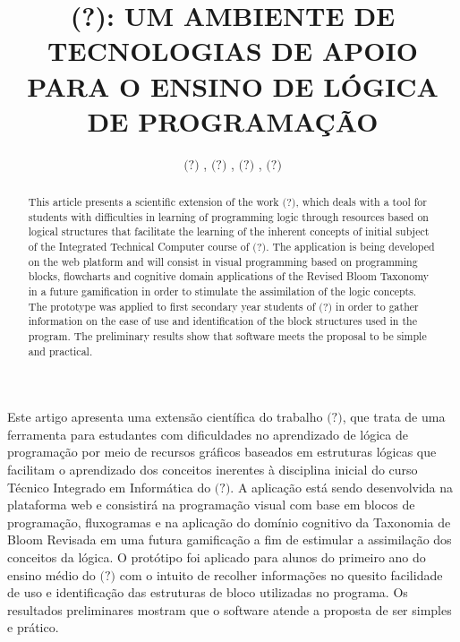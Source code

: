 \documentclass[12pt]{article}
\title{(?): UM AMBIENTE DE TECNOLOGIAS DE APOIO PARA O ENSINO DE LÓGICA DE PROGRAMAÇÃO}
\author{$\textbf{(?)}$ \inst{1}, $\textbf{(?)}$ \inst{1}, $\textbf{(?)}$ \inst{1}, $\textbf{(?)}$ \inst{1}}
\begin{document}
 

\maketitle

\begin{abstract}
This article presents a scientific extension of the work $\textit{(?)}$, which deals with a tool for students with difficulties in learning of programming logic through resources based on logical structures that facilitate the learning of the inherent concepts of initial subject of the Integrated Technical Computer course of $\textit{(?)}$. The application is being developed on the web platform and will consist in visual programming based on programming blocks, flowcharts and cognitive domain applications of the Revised Bloom Taxonomy in a future gamification in order to stimulate the assimilation of the logic concepts. The prototype was applied to first secondary year students of $\textit{(?)}$ in order to gather information on the ease of use and identification of the block structures used in the program. The preliminary results show that software meets the proposal to be simple and practical.
\end{abstract}
     
\begin{resumo}
Este artigo apresenta uma extensão científica do trabalho $\textit{(?)}$, que trata de uma ferramenta para estudantes com dificuldades no aprendizado de lógica de programação por meio de recursos gráficos baseados em estruturas lógicas que facilitam o aprendizado dos conceitos inerentes à disciplina inicial do curso Técnico Integrado em Informática do $\textit{(?)}$. A aplicação está sendo desenvolvida na plataforma web e consistirá na programação visual com base em blocos de programação, fluxogramas e na aplicação do domínio cognitivo da Taxonomia de Bloom Revisada em uma futura gamificação a fim de estimular a assimilação dos conceitos da lógica.  O protótipo foi aplicado para alunos do primeiro ano do ensino médio do $\textit{(?)}$ com o intuito de recolher informações no quesito facilidade de uso e identificação das estruturas de bloco utilizadas no programa. Os resultados preliminares mostram que o software atende a proposta de ser simples e prático.  
\end{resumo}
\end{document}
